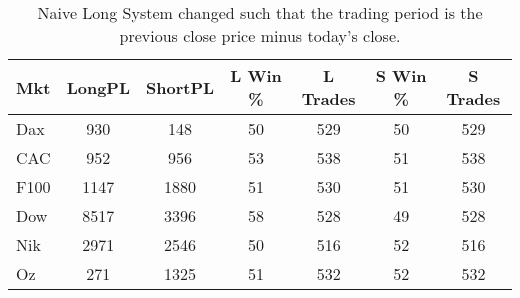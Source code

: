 \begin{table}[ht]
\centering
\caption[Naive Long System - Close to Close]{Naive Long System changed such that the trading period is the previous close price minus today's close.} 
\label{tab:mac_roc_results}
\begin{tabular}{lcccccc}
  \toprule Mkt & LongPL & ShortPL & L Win \% & L Trades & S Win \% & S Trades \\ 
  \midrule Dax & 930 & 148 & 50 & 529 & 50 & 529 \\ 
  CAC & 952 & 956 & 53 & 538 & 51 & 538 \\ 
  F100 & 1147 & 1880 & 51 & 530 & 51 & 530 \\ 
  Dow & 8517 & 3396 & 58 & 528 & 49 & 528 \\ 
  Nik & 2971 & 2546 & 50 & 516 & 52 & 516 \\ 
  Oz & 271 & 1325 & 51 & 532 & 52 & 532 \\ 
   \bottomrule \end{tabular}
\end{table}
